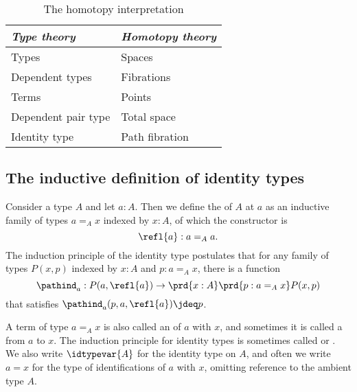 \begin{table}
\begin{center}
\caption{\label{tab:homotopy_interpretation}The homotopy interpretation}
\begin{tabular}{ll}
\toprule
\emph{Type theory} &  \emph{Homotopy theory} \\
\midrule
Types  & Spaces \\
Dependent types & Fibrations \\
Terms & Points \\
Dependent pair type & Total space \\
Identity type & Path fibration\\
\bottomrule
\end{tabular}
\end{center}
\end{table}

\subsection{The inductive definition of identity types}

\begin{defn}
  Consider a type $A$ and let $a:A$. Then we define the  of $A$ at $a$ as an inductive family of types $a =_A x$ indexed by $x:A$, of which the constructor is
  \begin{equation*}
    \refl{a}:a=_Aa.
  \end{equation*}
  The induction principle of the identity type postulates that for any family of types $P(x,p)$ indexed by $x:A$ and $p:a=_A x$, there is a function
  \begin{equation*}
    \pathind_a:P(a,\refl{a}) \to \prd{x:A}\prd{p:a=_A x} P(x,p)
  \end{equation*}
  that satisfies $\pathind_a(p,a,\refl{a})\jdeq p$.

  A term of type $a=_A x$ is also called an  of $a$ with $x$, and sometimes it is called a  from $a$ to $x$.
The induction principle for identity types is sometimes called  or . We also write $\idtypevar{A}$ for the identity type on $A$, and often we write $a=x$ for the type of identifications of $a$ with $x$, omitting reference to the ambient type $A$.
\end{defn}

